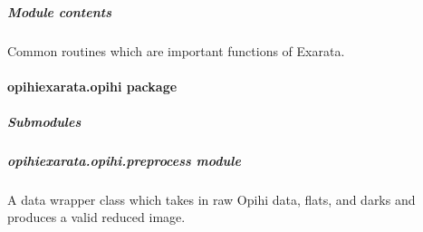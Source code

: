 \documentclass[letterpaper,11pt,english]{sphinxmanual}
\begin{document}
\subparagraph{Module contents}
\label{\detokenize{code/opihiexarata.library:module-opihiexarata.library}}\label{\detokenize{code/opihiexarata.library:module-contents}}
\sphinxAtStartPar
Common routines which are important functions of Exarata.

\sphinxstepscope


\paragraph{opihiexarata.opihi package}
\label{\detokenize{code/opihiexarata.opihi:opihiexarata-opihi-package}}\label{\detokenize{code/opihiexarata.opihi::doc}}

\subparagraph{Submodules}
\label{\detokenize{code/opihiexarata.opihi:submodules}}
\sphinxstepscope


\subparagraph{opihiexarata.opihi.preprocess module}
\label{\detokenize{code/opihiexarata.opihi.preprocess:module-opihiexarata.opihi.preprocess}}\label{\detokenize{code/opihiexarata.opihi.preprocess:opihiexarata-opihi-preprocess-module}}\label{\detokenize{code/opihiexarata.opihi.preprocess::doc}}
\sphinxAtStartPar
A data wrapper class which takes in raw Opihi data, flats, and darks and
produces a valid reduced image.
\end{document}
